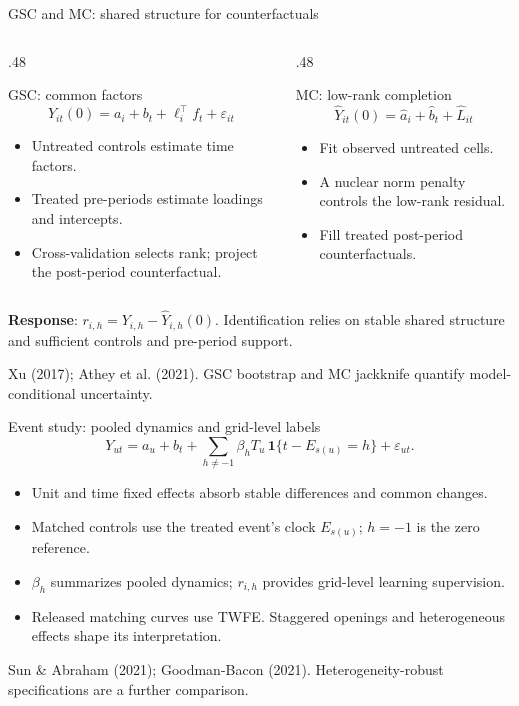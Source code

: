 \documentclass[aspectratio=169,11pt]{beamer}
\newcommand{\key}[1]{\textbf{\color{blue!55!black}#1}}
\begin{document}
\begin{frame}{GSC and MC: shared structure for counterfactuals}
\small
\begin{columns}[T]
\begin{column}{.48\textwidth}
\begin{block}{GSC: common factors}
\[
Y_{it}(0)=a_i+b_t+\ell_i^\top f_t+\varepsilon_{it}
\]
\begin{itemize}
 \item Untreated controls estimate time factors.
 \item Treated pre-periods estimate loadings and intercepts.
 \item Cross-validation selects rank; project the post-period counterfactual.
\end{itemize}
\end{block}
\end{column}
\begin{column}{.48\textwidth}
\begin{block}{MC: low-rank completion}
\[
\widehat Y_{it}(0)=\widehat a_i+\widehat b_t+\widehat L_{it}
\]
\begin{itemize}
 \item Fit observed untreated cells.
 \item A nuclear norm penalty controls the low-rank residual.
 \item Fill treated post-period counterfactuals.
\end{itemize}
\end{block}
\end{column}
\end{columns}
\par\medskip\key{Response}: $r_{i,h}=Y_{i,h}-\widehat Y_{i,h}(0)$.
Identification relies on stable shared structure and sufficient controls and pre-period support.
\par\footnotesize Xu (2017); Athey et al. (2021). GSC bootstrap and MC jackknife quantify model-conditional uncertainty.
\end{frame}

\begin{frame}{Event study: pooled dynamics and grid-level labels}
\[
Y_{ut}=a_u+b_t+
\sum_{h\ne-1}\beta_h T_u\,\mathbf 1\{t-E_{s(u)}=h\}+\varepsilon_{ut}.
\]
\begin{itemize}
 \item Unit and time fixed effects absorb stable differences and common changes.
 \item Matched controls use the treated event's clock $E_{s(u)}$; $h=-1$ is the zero reference.
 \item $\beta_h$ summarizes pooled dynamics; $r_{i,h}$ provides grid-level learning supervision.
 \item Released matching curves use TWFE. Staggered openings and heterogeneous effects shape its interpretation.
\end{itemize}
\footnotesize Sun \& Abraham (2021); Goodman-Bacon (2021). Heterogeneity-robust specifications are a further comparison.
\end{frame}
\end{document}
